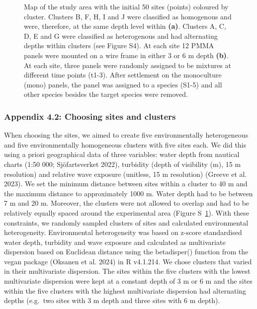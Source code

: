 \documentclass[
  letterpaper,
  DIV=11,
  numbers=noendperiod]{scrartcl}
\begin{document}
\begin{figure}


\caption{\label{fig-s12}Map of the study area with the initial 50 sites
(points) coloured by cluster. Clusters B, F, H, I and J were classified
as homogenous and were, therefore, at the same depth level within
\textbf{(a)}. Clusters A, C, D, E and G were classified as heterogenous
and had alternating depths within clusters (see Figure S4). At each site
12 PMMA panels were mounted on a wire frame in either 3 or 6 m depth
\textbf{(b)}. At each site, three panels were randomly assigned to be
mixtures at different time points (t1-3). After settlement on the
monoculture (mono) panels, the panel was assigned to a species (S1-5)
and all other species besides the target species were removed.}

\end{figure}%

\subsubsection{Appendix 4.2: Choosing sites and
clusters}\label{appendix-4.2-choosing-sites-and-clusters}

When choosing the sites, we aimed to create five environmentally
heterogeneous and five environmentally homogeneous clusters with five
sites each. We did this using a priori geographical data of three
variables: water depth from nautical charts (1:50 000; Sjöfartsverket
2022), turbidity (depth of visibility (m), 15 m resolution) and relative
wave exposure (unitless, 15 m resolution) (Greeve et al. 2023). We set
the minimum distance between sites within a cluster to 40 m and the
maximum distance to approximately 1000 m. Water depth had to be between
7 m and 20 m. Moreover, the clusters were not allowed to overlap and had
to be relatively equally spaced around the experimental area (Figure
S~\ref{fig-s12}). With these constraints, we randomly sampled clusters
of sites and calculated environmental heterogeneity. Environmental
heterogeneity was based on z-score standardised water depth, turbidity
and wave exposure and calculated as multivariate dispersion based on
Euclidean distance using the betadisper() function from the vegan
package (Oksanen et al. 2024) in R v4.1.214. We chose clusters that
varied in their multivariate dispersion. The sites within the five
clusters with the lowest multivariate dispersion were kept at a constant
depth of 3 m or 6 m and the sites within the five clusters with the
highest multivariate dispersion had alternating depths (e.g.~two sites
with 3 m depth and three sites with 6 m depth).
\end{document}
